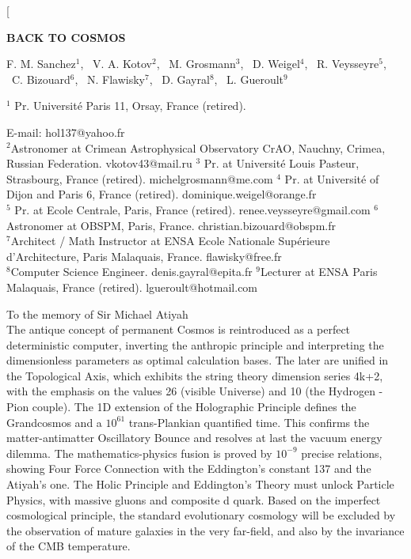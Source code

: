 \documentclass[twoside,draft]{article}
\begin{document}
\begin{sloppypar}

\renewcommand{\refname}{References}
\renewcommand{\tablename}{\small Table}
\renewcommand{\figurename}{\small Fig.}
\renewcommand{\contentsname}{Contents}


\twocolumn[%
\begin{center}
\renewcommand{\baselinestretch}{0.93}
{\Large\bfseries BACK TO COSMOS

}\par
\renewcommand{\baselinestretch}{1.0}
\bigskip
F. M. Sanchez$^1\!$, \ V. A. Kotov$^2\!$, \ M. Grosmann$^3$, \ D. Weigel$^4$, \ R. Veysseyre$^5$,\\ \ C. Bizouard$^6$, \ N. Flawisky$^7$, \ D. Gayral$^8$, \ L. Gueroult$^9$\\
{\footnotesize  $^1$ Pr. Universit\'{e} Paris 11, Orsay, France (retired).\rule{0pt}{12pt}
E-mail: hol137@yahoo.fr\\
$^2$Astronomer at Crimean Astrophysical Observatory CrAO, Nauchny, Crimea, Russian Federation. vkotov43@mail.ru
$^3$ Pr. at Universit\'{e} Louis Pasteur, Strasbourg, France (retired). michelgrosmann@me.com
$^4$ Pr. at Universit\'{e} of Dijon and Paris 6, France (retired). dominique.weigel@orange.fr
\\ $^5$ Pr. at Ecole Centrale, Paris, France (retired). renee.veysseyre@gmail.com
$^6$Astronomer at OBSPM, Paris, France. christian.bizouard@obspm.fr
\\ $^7$Architect / Math Instructor at ENSA Ecole Nationale Sup\'{e}rieure d'Architecture, Paris Malaquais, France. flawisky@free.fr
\\$^8$Computer Science Engineer. denis.gayral@epita.fr
$^9$Lecturer at ENSA Paris Malaquais, France (retired). lgueroult@hotmail.com

}\par
\medskip
{\small\parbox{11cm}{%
\hfill To the memory of Sir Michael Atiyah\\
The antique concept of permanent Cosmos is reintroduced as a perfect deterministic computer, inverting the anthropic principle and interpreting the dimensionless parameters as optimal calculation bases. The later are unified in the Topological Axis, which exhibits the string theory dimension series 4k+2, with the emphasis on the values 26 (visible Universe) and 10 (the Hydrogen - Pion couple). The 1D extension of the Holographic Principle defines the Grandcosmos and a $10^{61}$ trans-Plankian quantified time. This confirms the matter-antimatter Oscillatory Bounce and resolves at last the vacuum energy dilemma. The mathematics-physics fusion is proved by $10^{-9}$ precise relations, showing Four Force Connection with the Eddington's constant 137 and the Atiyah's one. The Holic Principle and Eddington's Theory must unlock Particle Physics, with massive gluons and composite d quark. Based on the imperfect cosmological principle, the standard evolutionary cosmology will be excluded by the observation of mature galaxies in the very far-field, and also by the invariance of the CMB temperature.  

}}
\end{center}
\end{sloppypar}
\end{document}
